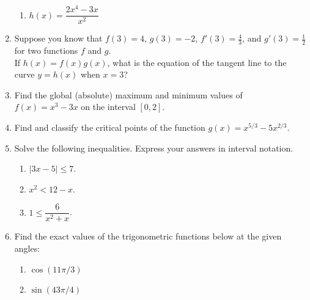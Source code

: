 \documentclass[12pt]{article}
\newcommand{\points}[1]{\marginpar{\hspace{24pt}[#1]}}
\begin{document}
\begin{enumerate}
\begin{enumerate}
 \item $h(x) = \dfrac{2x^4-3x}{x^2}$ \points{3}

\vspace{1.75in}

\end{enumerate}

 \item Suppose you know that $f(3)=4$, $g(3)=-2$, $f'(3) = \frac{4}{3}$, and $g'(3) = \frac{1}{2}$ for two functions $f$ and $g$.\\
 If $h(x) = f(x)g(x)$, what is the equation of the tangent line to the curve $y=h(x)$ when $x=3$?\points{3}

\newpage

\item Find the global (absolute) maximum and minimum values of $f(x) = x^3-3x$ on the interval $[0,2]$. \points{5}

\vspace{4in}

\item Find and classify the critical points of the function $g(x) = x^{5/3}-5x^{2/3}$. \points{5}

\newpage

\item Solve the following inequalities. Express your answers in interval notation.
\begin{enumerate}
 \item $\lvert 3x-5\rvert \leq 7$. \points{3}

\vspace{2in}

 \item $x^2<12-x$. \points{3}
 
 \vspace{2.5in}
 
 \item $1\leq \dfrac{6}{x^2+x}$. \points{4}
\end{enumerate}
\newpage



\item Find the exact values of the trigonometric functions below at the given angles:
\begin{enumerate}
 \item $\cos (11\pi/3)$ \points{2}

\vspace{1.5in}

 \item $\sin (43\pi/4)$ \points{2}


\end{enumerate}
\end{enumerate}
\end{document}
